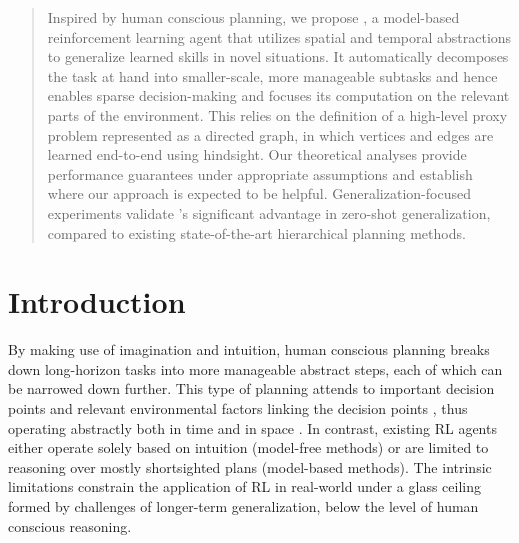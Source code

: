 \maketitle

\begin{abstract}
Inspired by human conscious planning, we propose \agentshort{}, a model-based reinforcement learning agent that utilizes spatial and temporal abstractions to generalize learned skills in novel situations. It automatically decomposes the task at hand into smaller-scale, more manageable subtasks and hence enables sparse decision-making and focuses its computation on the relevant parts of the environment. This relies on the definition of a high-level proxy problem represented as a directed graph, in which vertices and edges are learned end-to-end using hindsight. Our theoretical analyses provide performance guarantees under appropriate assumptions and establish where our approach is expected to be helpful. Generalization-focused experiments validate \agentshort{}'s significant advantage in zero-shot generalization, compared to existing state-of-the-art hierarchical planning methods.
\end{abstract}

\section{Introduction}
By making use of imagination and intuition, human conscious planning breaks down long-horizon tasks into more manageable abstract steps, each of which can be narrowed down further. This type of planning attends to important decision points \citep{sutton1999between} and relevant environmental factors linking the decision points \citep{tang2020neuroevolution}, thus operating abstractly both in time and in space \citep{dehane2017consciousness}. %
In contrast, existing RL agents either operate solely based on intuition (model-free methods) or are limited to reasoning over mostly shortsighted plans (model-based methods). The intrinsic limitations constrain the application of RL in real-world under a glass ceiling formed by challenges of longer-term generalization, below the level of human conscious reasoning. %

